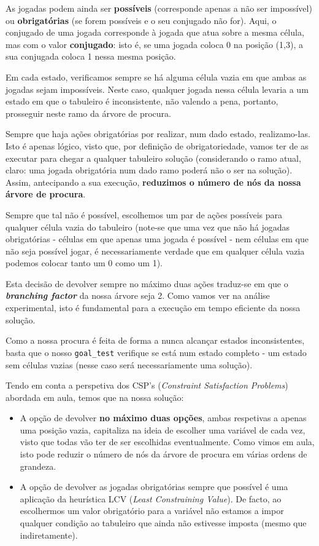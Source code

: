\documentclass[12pt,a4paper]{article}
\begin{document}
As jogadas podem ainda ser \textbf{possíveis} (corresponde apenas a não ser impossível) ou \textbf{obrigatórias} (se forem possíveis e o seu conjugado não for).
Aqui, o conjugado de uma jogada corresponde à jogada que atua sobre a mesma célula, mas com o valor \textbf{conjugado}: isto é, se uma jogada coloca 0 na posição (1,3), a sua conjugada coloca 1 nessa mesma posição.

Em cada estado, verificamos sempre se há alguma célula vazia em que ambas as jogadas sejam impossíveis.
Neste caso, qualquer jogada nessa célula levaria a um estado em que o tabuleiro é inconsistente, não valendo a pena, portanto, prosseguir neste ramo da árvore de procura.

Sempre que haja ações obrigatórias por realizar, num dado estado, realizamo-las.
Isto é apenas lógico, visto que, por definição de obrigatoriedade, vamos ter de as executar para chegar a qualquer tabuleiro solução (considerando o ramo atual, claro: uma jogada obrigatória num dado ramo poderá não o ser na solução).
Assim, antecipando a sua execução, \textbf{reduzimos o número de nós da nossa árvore de procura}.

Sempre que tal não é possível, escolhemos um par de ações possíveis para qualquer célula vazia do tabuleiro (note-se que uma vez que não há jogadas obrigatórias - células em que apenas uma jogada é possível - nem células em que não seja possível jogar, é necessariamente verdade que em qualquer célula vazia podemos colocar tanto um 0 como um 1).

Esta decisão de devolver sempre no máximo duas ações traduz-se em que o \textbf{\textit{branching factor}} da nossa árvore seja 2.
Como vamos ver na análise experimental, isto é fundamental para a execução em tempo eficiente da nossa solução.

Como a nossa procura é feita de forma a nunca alcançar estados inconsistentes, basta que o nosso \texttt{goal\_test} verifique se está num estado completo - um estado sem células vazias (nesse caso será necessariamente uma solução).

Tendo em conta a perspetiva dos CSP's (\textit{Constraint Satisfaction Problems}) abordada em aula, temos que na nossa solução:
\begin{itemize}
  \item A opção de devolver \textbf{no máximo duas opções}, ambas respetivas a apenas uma posição vazia, capitaliza na ideia de escolher uma variável de cada vez, visto que todas vão ter de ser escolhidas eventualmente.
        Como vimos em aula, isto pode reduzir o número de nós da árvore de procura em várias ordens de grandeza.
  \item A opção de devolver as jogadas obrigatórias sempre que possível é uma aplicação da heurística LCV (\textit{Least Constraining Value}).
        De facto, ao escolhermos um valor obrigatório para a variável não estamos a impor qualquer condição ao tabuleiro que ainda não estivesse imposta (mesmo que indiretamente).
\end{itemize}
\end{document}
